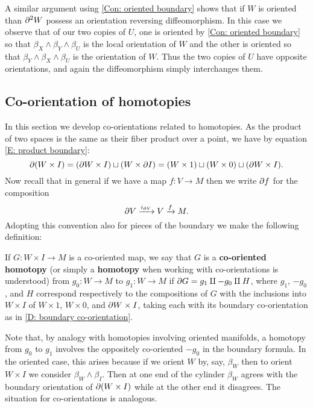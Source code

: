 \begin{remark}\label{R: bd2 oriented}
	A similar argument using \cref{Con: oriented boundary} shows that if $W$ is oriented than $\partial^2 W$ possess an orientation reversing diffeomorphism.
	In this case we observe that of our two copies of $U$, one is oriented by \cref{Con: oriented boundary} so that $\beta_X \wedge \beta_Y \wedge \beta_U$ is the local orientation of $W$ and the other is oriented so that $\beta_Y \wedge \beta_X \wedge \beta_U$ is the orientation of $W$.
	Thus the two copies of $U$ have opposite orientations, and again the diffeomorphism simply interchanges them.
\end{remark}

\subsection{Co-orientation of homotopies}\label{S: co-oriented homotopy}

In this section we develop co-orientations related to homotopies.
As the product of two spaces is the same as their fiber product over a point, we have by equation \eqref{E: product boundary}:
\begin{equation*}
	\partial(W \times I) =
	(\partial W \times I) \sqcup (W \times \partial I) =
	(W \times 1) \sqcup (W \times 0) \sqcup (\partial W \times I).
\end{equation*}
Now recall that in general if we have a map $f \colon V \to M$ then we write $\partial f$ for the composition
$$\partial V \xrightarrow{i_{\partial V}} V \xrightarrow{f} M.$$
Adopting this convention also for pieces of the boundary we make the following definition:

\begin{definition}\label{D: co-oriented homotopy}
	If $G \colon W \times I \to M$ is a co-oriented map, we say that $G$ is a \textbf{co-oriented homotopy} (or simply a \textbf{homotopy} when working with co-orientations is understood) from $g_0 \colon W \to M$ to $g_1 \colon W \to M$ if $\partial G = g_1 \amalg -g_0\amalg H$, where $g_1$, $-g_0$, and $H$ correspond respectively to the compositions of $G$ with the inclusions into $W \times I$ of $W \times 1$, $W \times 0$, and $\partial W \times I$, taking each with its boundary co-orientation as in \cref{D: boundary co-orientation}.
\end{definition}

Note that, by analogy with homotopies involving oriented manifolds, a homotopy from $g_0$ to $g_1$ involves the oppositely co-oriented $-g_0$ in the boundary formula.
In the oriented case, this arises because if we orient $W$ by, say, $\beta_W$ then to orient $W \times I$ we consider $\beta_W \wedge \beta_I$.
Then at one end of the cylinder $\beta_W$ agrees with the boundary orientation of $\partial (W \times I)$ while at the other end it disagrees.
The situation for co-orientations is analogous.

